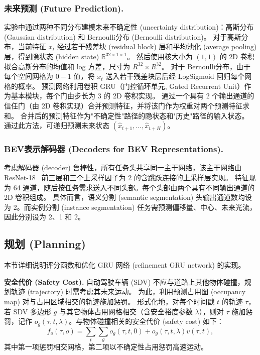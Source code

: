 \subsubsection{未来预测 (Future Prediction).}
实验中通过两种不同分布建模未来不确定性 (uncertainty distribution)：高斯分布 (Gaussian distribution) 和 Bernoulli分布 (Bernoulli distribution)。
%
对于高斯分布，当前特征 $x_t$ 经过若干残差块 (residual block) 层和平均池化 (average pooling) 层，得到隐状态 (hidden state) $\mathbb{R}^{32 \times 1 \times 1}$。
%
然后使用核大小为 $(1,1)$ 的 2D 卷积拟合高斯分布的均值和 log 方差，尺寸为 $R^{32} \times R^{32}$。
%
对于 Bernoulli分布，由于每个空间网格为 $0-1$ 值，将 $x_t$ 送入若干残差块层后经 LogSigmoid 回归每个网格的概率。
%
预测网络利用卷积 GRU（门控循环单元, Gated Recurrent Unit）作为基本模块，每个门由步长为 $3$ 的 2D 卷积实现。
%
通过一个具有 2 个输出通道的信任门（由 2D 卷积实现）合并预测特征，并将该门作为权重对两个预测特征求和。
%
合并后的预测特征作为"不确定性"路径的隐状态和"历史"路径的输入状态。
%
通过此方法，可递归预测未来状态 $(\hat{x}_{t+1},\dots, \hat{x}_{t+H})$。

\noindent
\subsubsection{BEV表示解码器 (Decoders for BEV Representations).}
考虑解码器 (decoder) 鲁棒性，所有任务头共享同一主干网络，该主干网络由 ResNet-18~\cite{he2016resnet} 前三层和三个上采样因子为 2 的含跳跃连接的上采样层实现。
%
特征现为 64 通道，随后按任务需求送入不同头部。每个头部由两个具有不同输出通道的 2D 卷积组成。
%
具体而言，语义分割 (semantic segmentation) 头输出通道数均设为 2。而实例分割 (instance segmentation) 任务需预测偏移量、中心、未来光流，因此分别设为 2、1 和 2。





\subsection{规划 (Planning)}
本节详细说明评分函数和优化 GRU 网络 (refinement GRU network) 的实现。

\noindent\textbf{安全代价 (Safety Cost).} 自动驾驶车辆 (SDV) 不应与道路上其他物体碰撞，规划轨迹 (trajectory) 时需考虑其未来运动。
%
为此，利用预测占用图 (occupancy map) 对与占用区域相交的轨迹施加惩罚。
%
形式化地，对每个时间戳 $t$ 的轨迹 $\tau$，若 SDV 多边形 $g$ 与其它物体占用网格相交（含安全裕度参数 $\lambda$），则对 $\tau$ 施加惩罚，记作 $o_g(\tau, t, \lambda)$。与物体碰撞相关的安全代价 (safety cost) 如下：
\begin{equation}
    f_o(\tau, o) = \sum_t \sum_g o_g(\tau, t, 0) + o_g(\tau, t, \lambda) v(\tau, t),
\end{equation}
其中第一项惩罚相交网格，第二项以不确定性占用惩罚高速运动。

